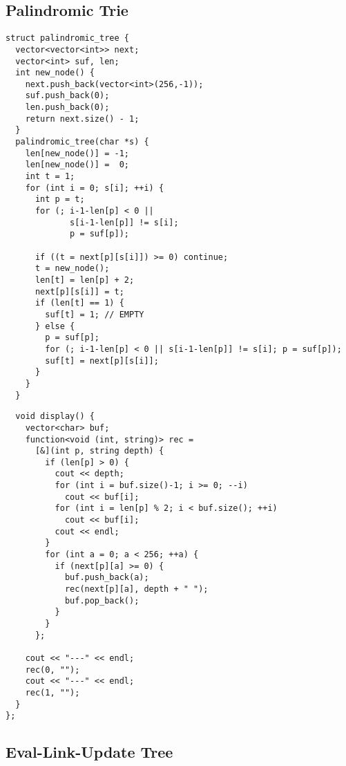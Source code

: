 \newpage

\subsection{Palindromic Trie}

\begin{center}
\begin{minipage}[t]{0.45\linewidth}
\begin{lstlisting}
struct palindromic_tree {
  vector<vector<int>> next;
  vector<int> suf, len;
  int new_node() {
    next.push_back(vector<int>(256,-1));
    suf.push_back(0);
    len.push_back(0);
    return next.size() - 1;
  }
  palindromic_tree(char *s) {
    len[new_node()] = -1;
    len[new_node()] =  0;
    int t = 1; 
    for (int i = 0; s[i]; ++i) {
      int p = t;
      for (; i-1-len[p] < 0 || 
             s[i-1-len[p]] != s[i];
             p = suf[p]);
      
      if ((t = next[p][s[i]]) >= 0) continue;
      t = new_node();
      len[t] = len[p] + 2;
      next[p][s[i]] = t;
      if (len[t] == 1) { 
        suf[t] = 1; // EMPTY
      } else {
        p = suf[p];
        for (; i-1-len[p] < 0 || s[i-1-len[p]] != s[i]; p = suf[p]);
        suf[t] = next[p][s[i]];
      }
    }
  }
\end{lstlisting}
\end{minipage}
\qquad
\begin{minipage}[t]{0.45\linewidth}
\begin{lstlisting}
  void display() {
    vector<char> buf;
    function<void (int, string)> rec =
      [&](int p, string depth) {
        if (len[p] > 0) {
          cout << depth;
          for (int i = buf.size()-1; i >= 0; --i)
            cout << buf[i];
          for (int i = len[p] % 2; i < buf.size(); ++i)
            cout << buf[i];
          cout << endl;
        }
        for (int a = 0; a < 256; ++a) {
          if (next[p][a] >= 0) {
            buf.push_back(a);
            rec(next[p][a], depth + " ");
            buf.pop_back();
          }
        }
      };
    
    cout << "---" << endl;
    rec(0, "");
    cout << "---" << endl;
    rec(1, "");
  }
};
\end{lstlisting}
\end{minipage}
\end{center}

\newpage

\subsection{Eval-Link-Update Tree}

